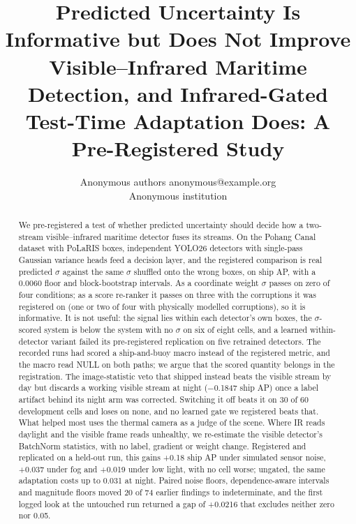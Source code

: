 \documentclass[10pt]{article}
\title{Predicted Uncertainty Is Informative but Does Not Improve Visible--Infrared Maritime Detection, and Infrared-Gated Test-Time Adaptation Does: A Pre-Registered Study}
\author{\name Anonymous authors \email anonymous@example.org \\
      \addr Anonymous institution}
\begin{document}
\maketitle

\begin{abstract}
We pre-registered a test of whether predicted uncertainty should decide how a two-stream visible--infrared maritime detector fuses its streams. On the Pohang Canal dataset with PoLaRIS boxes, independent YOLO26 detectors with single-pass Gaussian variance heads feed a decision layer, and the registered comparison is real predicted $\sigma$ against the same $\sigma$ shuffled onto the wrong boxes, on ship AP, with a 0.0060 floor and block-bootstrap intervals. As a coordinate weight $\sigma$ passes on zero of four conditions; as a score re-ranker it passes on three with the corruptions it was registered on (one or two of four with physically modelled corruptions), so it is informative. It is not useful: the signal lies within each detector's own boxes, the $\sigma$-scored system is below the system with no $\sigma$ on six of eight cells, and a learned within-detector variant failed its pre-registered replication on five retrained detectors. The recorded runs had scored a ship-and-buoy macro instead of the registered metric, and the macro read NULL on both paths; we argue that the scored quantity belongs in the registration. The image-statistic veto that shipped instead beats the visible stream by day but discards a working visible stream at night ($-$0.1847 ship AP) once a label artifact behind its night arm was corrected. Switching it off beats it on 30 of 60 development cells and loses on none, and no learned gate we registered beats that. What helped most uses the thermal camera as a judge of the scene. Where IR reads daylight and the visible frame reads unhealthy, we re-estimate the visible detector's BatchNorm statistics, with no label, gradient or weight change. Registered and replicated on a held-out run, this gains +0.18 ship AP under simulated sensor noise, +0.037 under fog and +0.019 under low light, with no cell worse; ungated, the same adaptation costs up to 0.031 at night. Paired noise floors, dependence-aware intervals and magnitude floors moved 20 of 74 earlier findings to indeterminate, and the first logged look at the untouched run returned a gap of +0.0216 that excludes neither zero nor 0.05.
\end{abstract}
\end{document}
